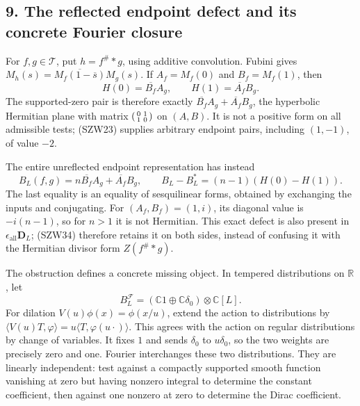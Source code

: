 \documentclass[
  10pt,
  a4paper,
]{article}
\begin{document}
\subsection{9. The reflected endpoint defect and its concrete Fourier
closure}\label{the-reflected-endpoint-defect-and-its-concrete-fourier-closure}

For \(f,g\in\mathcal T\), put \(h=f^\#*g\), using additive convolution.
Fubini gives \(M_h(s)=\overline{M_f(1-\overline s)}M_g(s)\). If
\(A_f=M_f(0)\) and \(B_f=M_f(1)\), then \[
H(0)=\overline{B_f}A_g,\qquad H(1)=\overline{A_f}B_g.
\tag{SZW38}
\] The supported-zero pair is therefore exactly
\(\overline{B_f}A_g+\overline{A_f}B_g\), the hyperbolic Hermitian plane
with matrix \(\begin{psmallmatrix}0&1\\1&0\end{psmallmatrix}\) on
\((A,B)\). It is not a positive form on all admissible tests; (SZW23)
supplies arbitrary endpoint pairs, including \((1,-1)\), of value
\(-2\).

The entire unreflected endpoint representation has instead \[
B_L(f,g)=n\overline{B_f}A_g+\overline{A_f}B_g,
\qquad
B_L-B_L^*=(n-1)(H(0)-H(1)).
\tag{SZW39}
\] The last equality is an equality of sesquilinear forms, obtained by
exchanging the inputs and conjugating. For \((A_f,B_f)=(1,i)\), its
diagonal value is \(-i(n-1)\), so for \(n>1\) it is not Hermitian. This
exact defect is also present in
\(\epsilon_{\mathrm{all}}\boldsymbol D_L\); (SZW34) therefore retains it
on both sides, instead of confusing it with the Hermitian divisor form
\(Z(f^\#*g)\).

The obstruction defines a concrete missing object. In tempered
distributions on \(\mathbb R\), let \[
B_L^{\mathcal F}=(\mathbb C1\oplus\mathbb C\delta_0)\otimes\mathbb C[L].
\tag{SZW40}
\] For dilation \(V(u)\phi(x)=\phi(x/u)\), extend the action to
distributions by
\(\langle V(u)T,\varphi\rangle=u\langle T,\varphi(u\cdot)\rangle\). This
agrees with the action on regular distributions by change of variables.
It fixes \(1\) and sends \(\delta_0\) to \(u\delta_0\), so the two
weights are precisely zero and one. Fourier interchanges these two
distributions. They are linearly independent: test against a compactly
supported smooth function vanishing at zero but having nonzero integral
to determine the constant coefficient, then against one nonzero at zero
to determine the Dirac coefficient.
\end{document}
